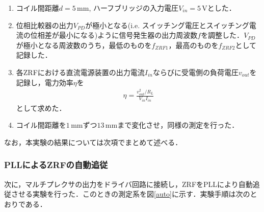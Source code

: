 \begin{enumerate}
  \item コイル間距離$d =5 \, \mathrm{mm}$, ハーフブリッジの入力電圧$V_{in}=5 \, \mathrm{V}$とした．
  \item 位相比較器の出力$V_{PD}$が極小となる(i.e. スイッチング電圧とスイッチング電流の位相差が最小になる)ように信号発生器の出力周波数$f$を調整した．$V_{PD}$が極小となる周波数のうち，最低のものを$f_{ZRF1}$，最高のものを$f_{ZRF2}$として記録した．
  \item 各ZRFにおける直流電源装置の出力電流$I_{in}$ならびに受電側の負荷電圧$v_{out}$を記録し，電力効率$\eta$を
  \begin{align}
  \eta=\frac{v_{out}^2/R_L}{V_{in}I_{in}}
  \end{align}
  として求めた．
  \item コイル間距離を$1 \, \mathrm{mm}$ずつ$13 \, \mathrm {mm}$まで変化させ，同様の測定を行った．
\end{enumerate}
なお，本実験の結果については次項でまとめて述べる．

\subsubsection{PLLによるZRFの自動追従}
次に，マルチプレクサの出力をドライバ回路に接続し，ZRFをPLLにより自動追従させる実験を行った．このときの測定系を図\ref{auto}に示す．実験手順は次のとおりである．

